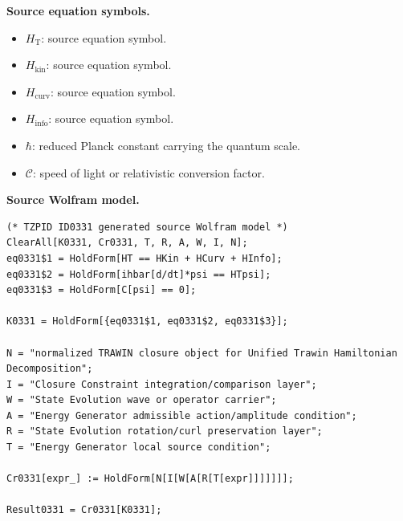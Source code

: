 \begin{minipage}[t]{0.49\linewidth}
\begingroup
\small
\raggedright
\textbf{Source equation symbols.}\par
\begin{itemize}[leftmargin=1.35em,itemsep=1pt,topsep=1pt,parsep=0pt]
    \item $H_{\mathrm{T}}$: source equation symbol.
    \item $H_{\mathrm{kin}}$: source equation symbol.
    \item $H_{\mathrm{curv}}$: source equation symbol.
    \item $H_{\mathrm{info}}$: source equation symbol.
    \item $\hbar$: reduced Planck constant carrying the quantum scale.
    \item $\mathcal{C}$: speed of light or relativistic conversion factor.
\end{itemize}
\endgroup
\end{minipage}\hfill
\begin{minipage}[t]{0.47\linewidth}
\begingroup
\scriptsize
\raggedright
\textbf{Source Wolfram model.}\par
\begin{Verbatim}[fontsize=\tiny,breaklines=true,breakanywhere=true]
(* TZPID ID0331 generated source Wolfram model *)
ClearAll[K0331, Cr0331, T, R, A, W, I, N];
eq0331$1 = HoldForm[HT == HKin + HCurv + HInfo];
eq0331$2 = HoldForm[ihbar[d/dt]*psi == HTpsi];
eq0331$3 = HoldForm[C[psi] == 0];

K0331 = HoldForm[{eq0331$1, eq0331$2, eq0331$3}];

N = "normalized TRAWIN closure object for Unified Trawin Hamiltonian Decomposition";
I = "Closure Constraint integration/comparison layer";
W = "State Evolution wave or operator carrier";
A = "Energy Generator admissible action/amplitude condition";
R = "State Evolution rotation/curl preservation layer";
T = "Energy Generator local source condition";

Cr0331[expr_] := HoldForm[N[I[W[A[R[T[expr]]]]]]];

Result0331 = Cr0331[K0331];
\end{Verbatim}
\endgroup
\end{minipage}


